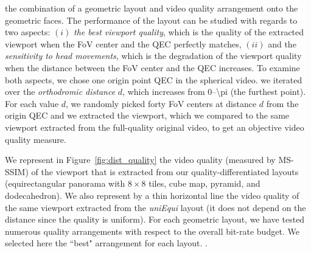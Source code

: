  the
combination of a geometric layout and video quality arrangement onto
the geometric faces. The performance of the layout can be studied with
regards to two aspects: $(i)$ \emph{the best viewport quality}, which
is the quality of the extracted viewport when the \ac{FoV} center and
the \ac{QEC} perfectly matches, $(ii)$ and the \emph{sensitivity to
head movements}, which is the degradation of the viewport quality when
the distance between the FoV center and the \ac{QEC} increases. To
examine both aspects, we chose one origin point \ac{QEC} in the
spherical video.  we iterated over the \emph{orthodromic
distance} $d$, which increases from \numrange{0}{\pi} (the furthest
point). For each value $d$, we randomly picked forty \ac{FoV} centers
at distance $d$ from the origin \ac{QEC} and we extracted the
viewport, which we compared to the same viewport extracted from the
full-quality original video, to get an objective video quality
measure.



We represent in Figure~\ref{fig:dist_quality} the video quality
(measured by \acs{MS-SSIM}) of the viewport that is extracted from our
quality-differentiated layouts (equirectangular panorama with
$8\!\times\! 8$ tiles, cube map, pyramid, and dodecahedron). We also
represent by a thin horizontal line the video quality of the same
viewport extracted from the \textit{uniEqui} layout (it does
not depend on the distance since the quality is uniform). For each
geometric layout, we have tested numerous quality arrangements with
respect to the overall bit-rate budget. We selected here the ``best"
arrangement for each layout. . 

